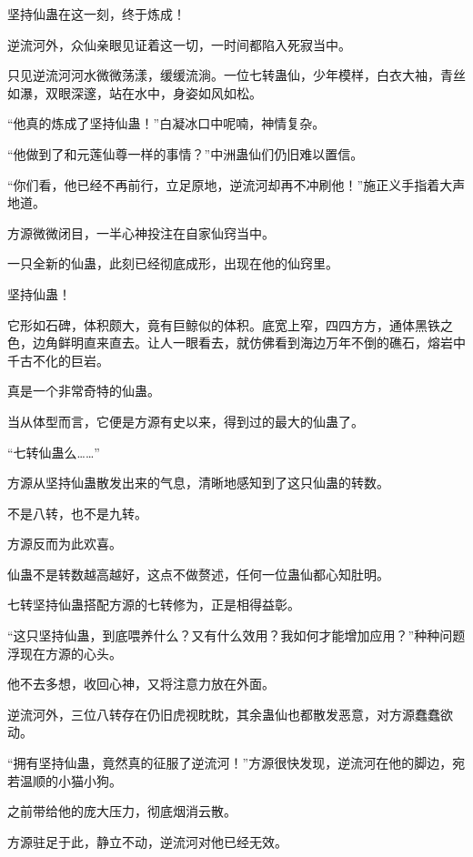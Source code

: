 
\begin{this_body}



坚持仙蛊在这一刻，终于炼成！

逆流河外，众仙亲眼见证着这一切，一时间都陷入死寂当中。

只见逆流河河水微微荡漾，缓缓流淌。一位七转蛊仙，少年模样，白衣大袖，青丝如瀑，双眼深邃，站在水中，身姿如风如松。

“他真的炼成了坚持仙蛊！”白凝冰口中呢喃，神情复杂。

“他做到了和元莲仙尊一样的事情？”中洲蛊仙们仍旧难以置信。

“你们看，他已经不再前行，立足原地，逆流河却再不冲刷他！”施正义手指着大声地道。

方源微微闭目，一半心神投注在自家仙窍当中。

一只全新的仙蛊，此刻已经彻底成形，出现在他的仙窍里。

坚持仙蛊！

它形如石碑，体积颇大，竟有巨鲸似的体积。底宽上窄，四四方方，通体黑铁之色，边角鲜明直来直去。让人一眼看去，就仿佛看到海边万年不倒的礁石，熔岩中千古不化的巨岩。

真是一个非常奇特的仙蛊。

当从体型而言，它便是方源有史以来，得到过的最大的仙蛊了。

“七转仙蛊么……”

方源从坚持仙蛊散发出来的气息，清晰地感知到了这只仙蛊的转数。

不是八转，也不是九转。

方源反而为此欢喜。

仙蛊不是转数越高越好，这点不做赘述，任何一位蛊仙都心知肚明。

七转坚持仙蛊搭配方源的七转修为，正是相得益彰。

“这只坚持仙蛊，到底喂养什么？又有什么效用？我如何才能增加应用？”种种问题浮现在方源的心头。

他不去多想，收回心神，又将注意力放在外面。

逆流河外，三位八转存在仍旧虎视眈眈，其余蛊仙也都散发恶意，对方源蠢蠢欲动。

“拥有坚持仙蛊，竟然真的征服了逆流河！”方源很快发现，逆流河在他的脚边，宛若温顺的小猫小狗。

之前带给他的庞大压力，彻底烟消云散。

方源驻足于此，静立不动，逆流河对他已经无效。


\end{this_body}
